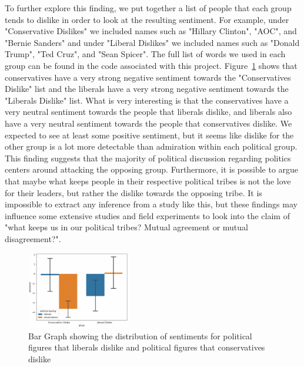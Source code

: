 \documentclass[conference]{IEEEtran}
\begin{document}
To further explore this finding, we put together a list of people that each group tends to dislike in order to look at the resulting sentiment. For example, under "Conservative Dislikes" we included names such as "Hillary Clinton", "AOC", and "Bernie Sanders" and under "Liberal Dislikes" we included names such as "Donald Trump", "Ted Cruz", and "Sean Spicer". The full list of words we used in each group can be found in the code associated with this project. Figure~\ref{fig:Embeddings3} shows that conservatives have a very strong negative sentiment towards the "Conservatives Dislike" list and the liberals have a very strong negative sentiment towards the "Liberals Dislike" list. What is very interesting is that the conservatives have a very neutral sentiment towards the people that liberals dislike, and liberals also have a very neutral sentiment towards the people that conservatives dislike. We expected to see at least some positive sentiment, but it seems like dislike for the other group is a lot more detectable than admiration within each political group. This finding suggests that the majority of political discussion regarding politics centers around attacking the opposing group. Furthermore, it is possible to argue that maybe what keeps people in their respective political tribes is not the love for their leaders, but rather the dislike towards the opposing tribe. It is impossible to extract any inference from a study like this, but these findings may influence some extensive studies and field experiments to look into the claim of "what keeps us in our political tribes? Mutual agreement or mutual disagreement?".

\begin{figure}[tb]
    \centering
    \includegraphics[width=0.4\textwidth]{Embeddings3.pdf}
    \vspace{-2mm}
    \caption{Bar Graph showing the distribution of sentiments for political figures that liberals dislike and political figures that conservatives dislike}
    \label{fig:Embeddings3}
    \vspace{-5mm}
\end{figure}
\end{document}

